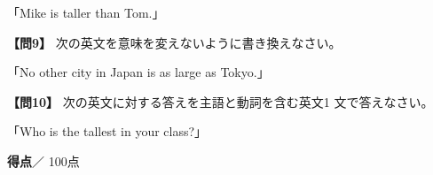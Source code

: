 「Mike is taller than Tom.」
\testqsepsmall

\noindent\textbf{【問9】} 次の英文を意味を変えないように書き換えなさい。

「No other city in Japan is as large as Tokyo.」
\testqsepsmall

\noindent\textbf{【問10】} 次の英文に対する答えを主語と動詞を含む英文1 文で答えなさい。

「Who is the tallest in your class?」
\testqsep

\begin{flushright}
\textbf{得点}\testscoreblank ／ 100点
\end{flushright}
